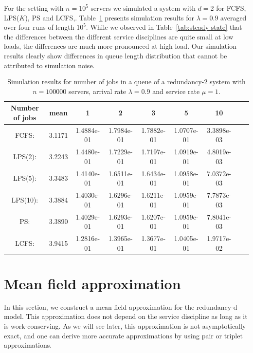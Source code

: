 \documentclass[acmsmall,nonacm]{acmart}
\begin{document}
For the setting with $n=10^5$ servers we simulated a system with $d=2$ for FCFS, LPS($K$), PS and LCFS,. Table~\ref{tab:simul10000} presents simulation results for $\lambda=0.9$ averaged over four runs of length $10^5$.  While we observed in Table~\ref{tab:steady-state} that the differences between the different service disciplines are quite small at low loads, the differences are much more pronounced at high load. Our simulation results clearly show differences in queue length distribution that cannot be attributed to simulation noise.


\begin{table}[t]
    \centering
    \begin{tabular}{|c|c|c|c|c|c|c|c|c|}
    \hline 
        Number of jobs & mean & 1 & 2 & 3 & 5 & 10\\ \hline
         FCFS:	&3.1171  & 1.4884e-01  & 1.7984e-01 &  1.7882e-01 &  1.0707e-01 &  3.3898e-03\\\hline
         LPS(2): & 3.2243  & 1.4480e-01  & 1.7229e-01   &1.7197e-01 &  1.0919e-01 &  4.8019e-03\\
         LPS(5):& 3.3483 &1.4140e-01  & 1.6511e-01 &  1.6434e-01   &1.0958e-01  & 7.0372e-03\\
         LPS(10): &3.3884 &  1.4030e-01  & 1.6296e-01 &  1.6211e-01 &  1.0959e-01  & 7.7873e-03 \\
         \hline
         PS:&	3.3890  & 1.4029e-01  & 1.6293e-01 &  1.6207e-01 &  1.0959e-01  & 7.8041e-03\\ \hline
         LCFS:& 3.9415 &  1.2816e-01 &  1.3965e-01&   1.3677e-01  & 1.0405e-01  & 1.9717e-02
         \\\hline
    \end{tabular}
    \caption{Simulation results for number of jobs in a queue of a redundancy-2 system with $n=100000$ servers, arrival rate $\lambda=0.9$ and service rate $\mu=1$. }
    \label{tab:simul10000}
\end{table}




\section{Mean field approximation}
\label{sec:approx}

In this section, we construct a mean field approximation for the redundancy-d model. This approximation does not depend on the service discipline as long as it is work-conserving. As we will see later, this approximation is not asymptotically exact, and one can derive more accurate approximations by using pair or triplet approximations.  
\end{document}
